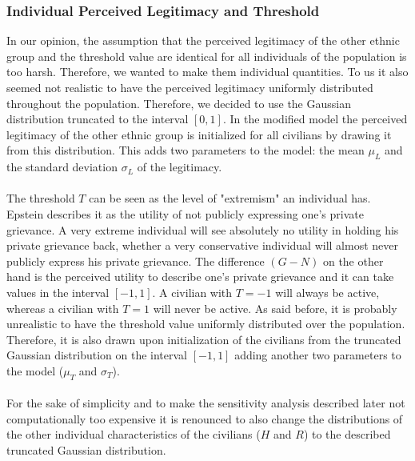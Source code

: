 \documentclass[11pt]{article}
\begin{document}
\subsubsection{Individual Perceived Legitimacy and Threshold}
In our opinion, the assumption that the perceived legitimacy of the other ethnic group and the threshold value are identical for all individuals of the population is too harsh. Therefore, we wanted to make them individual quantities. To us it also seemed not realistic to have the perceived legitimacy uniformly distributed throughout the population. Therefore, we decided to use the Gaussian distribution truncated to the interval $[0,1]$. In the modified model the perceived legitimacy of the other ethnic group is initialized for all civilians by drawing it from this distribution. This adds two parameters to the model: the mean $\mu_L$ and the standard deviation $\sigma_L$ of the legitimacy.\\
\\
The threshold $T$ can be seen as the level of "extremism" an individual has. Epstein describes it as the utility of not publicly expressing one's private grievance. A very extreme individual will see absolutely no utility in holding his private grievance back, whether a very conservative individual will almost never publicly express his private grievance. The difference $(G-N)$ on the other hand is the perceived utility to describe one's private grievance and it can take values in the interval $[-1,1]$. A civilian with $T = -1$ will always be active, whereas a civilian with $T = 1$ will never be active. As said before, it is probably unrealistic to have the threshold value uniformly distributed over the population. Therefore, it is also drawn upon initialization of the civilians from the truncated Gaussian distribution on the interval $[-1,1]$ adding another two parameters to the model ($\mu_T$ and $\sigma_T$).\\
\\
For the sake of simplicity and to make the sensitivity analysis described later not computationally too expensive it is renounced to also change the distributions of the other individual characteristics of the civilians ($H$ and $R$) to the described truncated Gaussian distribution.
\end{document}
